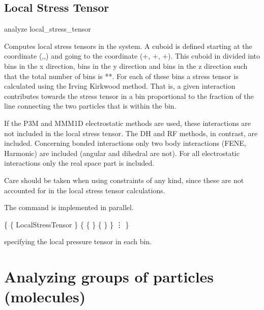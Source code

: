 \subsection{Local Stress Tensor}
\label{analyze:localstresstensor}

\begin{essyntax}
  analyze local_stress_tensor             
\end{essyntax}

Computes local stress tensors in the system.  A cuboid is defined starting at the coordinate
(,,) and going to the coordinate
(+, +,
+).  This cuboid in divided into  bins in the x
direction,  bins in the y direction and  bins in the z direction such that
the total number of bins is **.  For each of these bins a stress
tensor is calculated using the Irving Kirkwood method.  That is, a given interaction contributes
towards the stress tensor in a bin proportional to the fraction of the line connecting the two
particles that is within the bin.

If the P3M and MMM1D electrostatic methods are used, these
interactions are not included in the local stress tensor.  The DH and
RF methods, in contrast, are included. Concerning bonded interactions 
only two body interactions (FENE, Harmonic) are included (angular and dihedral are not).
For all electrostatic interactions only the real space part is included.

Care should be taken when using constraints of any kind, since these are not accounted for
in the local stress tensor calculations. 

The command is implemented in parallel.


\begin{code}
\{ \{ LocalStressTensor \}
   \{ \{    \} \{  \} \}
      \vdots
\}
\end{code}
specifying the local pressure tensor in each bin.

\section{Analyzing groups of particles (molecules)}
\label{analyze:set}

